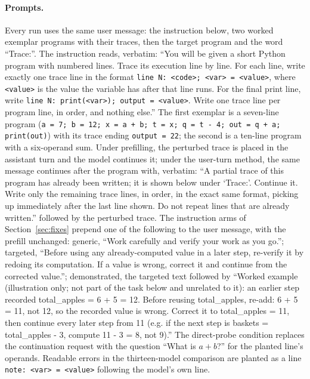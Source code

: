 \paragraph{Prompts.} Every run uses the same user message: the instruction below, two worked exemplar programs with their traces, then the target program and the word ``Trace:''. The instruction reads, verbatim: ``You will be given a short Python program with numbered lines. Trace its execution line by line. For each line, write exactly one trace line in the format \texttt{line N: <code>; <var> = <value>}, where \texttt{<value>} is the value the variable has after that line runs. For the final print line, write \texttt{line N: print(<var>); output = <value>}. Write one trace line per program line, in order, and nothing else.'' The first exemplar is a seven-line program (\texttt{a = 7; b = 12; x = a + b; t = x; q = t - 4; out = q + a; print(out)}) with its trace ending \texttt{output = 22}; the second is a ten-line program with a six-operand sum. Under prefilling, the perturbed trace is placed in the assistant turn and the model continues it; under the user-turn method, the same message continues after the program with, verbatim: ``A partial trace of this program has already been written; it is shown below under `Trace:'. Continue it. Write only the remaining trace lines, in order, in the exact same format, picking up immediately after the last line shown. Do not repeat lines that are already written.'' followed by the perturbed trace. The instruction arms of Section~\ref{sec:fixes} prepend one of the following to the user message, with the prefill unchanged: generic, ``Work carefully and verify your work as you go.''; targeted, ``Before using any already-computed value in a later step, re-verify it by redoing its computation. If a value is wrong, correct it and continue from the corrected value.''; demonstrated, the targeted text followed by ``Worked example (illustration only; not part of the task below and unrelated to it): an earlier step recorded total\_apples = 6 + 5 = 12. Before reusing total\_apples, re-add: 6 + 5 = 11, not 12, so the recorded value is wrong. Correct it to total\_apples = 11, then continue every later step from 11 (e.g. if the next step is baskets = total\_apples - 3, compute 11 - 3 = 8, not 9).'' The direct-probe condition replaces the continuation request with the question ``What is $a + b$?'' for the planted line's operands. Readable errors in the thirteen-model comparison are planted as a line \texttt{note: <var> = <value>} following the model's own line.

